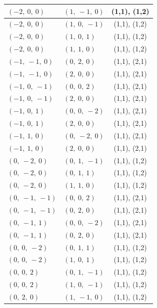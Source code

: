 \documentclass[11pt]{article}
\theoremstyle{definition}
\begin{document}
\begin{longtable}{|l|l|c|}
    $\left( -2, \  0, \  0\right)$ & $\left( 1, \  -1, \  0\right)$ & (1,1), (1,2) \\
    \hline
    $\left( -2, \  0, \  0\right)$ & $\left( 1, \  0, \  -1\right)$ & (1,1), (1,2) \\
    \hline
    $\left( -2, \  0, \  0\right)$ & $\left( 1, \  0, \  1\right)$ & (1,1), (1,2) \\
    \hline
    $\left( -2, \  0, \  0\right)$ & $\left( 1, \  1, \  0\right)$ & (1,1), (1,2) \\
    \hline
    $\left( -1, \  -1, \  0\right)$ & $\left( 0, \  2, \  0\right)$ & (1,1), (2,1) \\
    \hline
    $\left( -1, \  -1, \  0\right)$ & $\left( 2, \  0, \  0\right)$ & (1,1), (2,1) \\
    \hline
    $\left( -1, \  0, \  -1\right)$ & $\left( 0, \  0, \  2\right)$ & (1,1), (2,1) \\
    \hline
    $\left( -1, \  0, \  -1\right)$ & $\left( 2, \  0, \  0\right)$ & (1,1), (2,1) \\
    \hline
    $\left( -1, \  0, \  1\right)$ & $\left( 0, \  0, \  -2\right)$ & (1,1), (2,1) \\
    \hline
    $\left( -1, \  0, \  1\right)$ & $\left( 2, \  0, \  0\right)$ & (1,1), (2,1) \\
    \hline
    $\left( -1, \  1, \  0\right)$ & $\left( 0, \  -2, \  0\right)$ & (1,1), (2,1) \\
    \hline
    $\left( -1, \  1, \  0\right)$ & $\left( 2, \  0, \  0\right)$ & (1,1), (2,1) \\
    \hline
    $\left( 0, \  -2, \  0\right)$ & $\left( 0, \  1, \  -1\right)$ & (1,1), (1,2) \\
    \hline
    $\left( 0, \  -2, \  0\right)$ & $\left( 0, \  1, \  1\right)$ & (1,1), (1,2) \\
    \hline
    $\left( 0, \  -2, \  0\right)$ & $\left( 1, \  1, \  0\right)$ & (1,1), (1,2) \\
    \hline
    $\left( 0, \  -1, \  -1\right)$ & $\left( 0, \  0, \  2\right)$ & (1,1), (2,1) \\
    \hline
    $\left( 0, \  -1, \  -1\right)$ & $\left( 0, \  2, \  0\right)$ & (1,1), (2,1) \\
    \hline
    $\left( 0, \  -1, \  1\right)$ & $\left( 0, \  0, \  -2\right)$ & (1,1), (2,1) \\
    \hline
    $\left( 0, \  -1, \  1\right)$ & $\left( 0, \  2, \  0\right)$ & (1,1), (2,1) \\
    \hline
    $\left( 0, \  0, \  -2\right)$ & $\left( 0, \  1, \  1\right)$ & (1,1), (1,2) \\
    \hline
    $\left( 0, \  0, \  -2\right)$ & $\left( 1, \  0, \  1\right)$ & (1,1), (1,2) \\
    \hline
    $\left( 0, \  0, \  2\right)$ & $\left( 0, \  1, \  -1\right)$ & (1,1), (1,2) \\
    \hline
    $\left( 0, \  0, \  2\right)$ & $\left( 1, \  0, \  -1\right)$ & (1,1), (1,2) \\
    \hline
    $\left( 0, \  2, \  0\right)$ & $\left( 1, \  -1, \  0\right)$ & (1,1), (1,2) \\
    \hline
\end{longtable}
\end{document}
